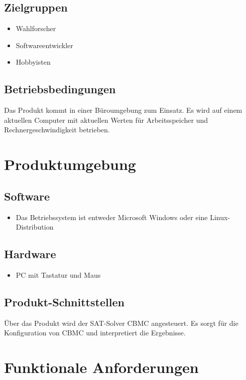 \documentclass[a4paper]{scrreprt}
\begin{document}
\section{Zielgruppen}
\begin{itemize}
\item Wahlforscher
\item Softwareentwickler
\item Hobbyisten
\end{itemize}

\section{Betriebsbedingungen}
Das Produkt kommt in einer Büroumgebung zum Einsatz. Es wird auf einem aktuellen Computer mit aktuellen Werten für Arbeitsspeicher und Rechnergeschwindigkeit betrieben.


\chapter{Produktumgebung}

\section{Software}
\begin{itemize}
\item Das Betriebssystem ist entweder Microsoft Windows oder eine Linux-Distribution
\end{itemize}

\section{Hardware}
\begin{itemize}
\item PC mit Tastatur und Maus
\end{itemize}

\section{Produkt-Schnittstellen}
Über das Produkt wird der SAT-Solver CBMC angesteuert. Es sorgt für die Konfiguration von CBMC und interpretiert die Ergebnisse.



\chapter{Funktionale Anforderungen}
\end{document}
